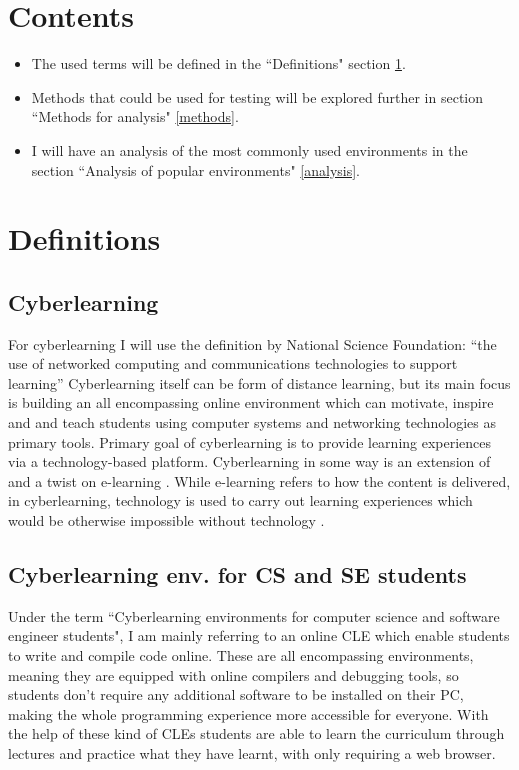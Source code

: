 \documentclass[10pt,english,a4paper]{article}
\begin{document}
\section*{Contents}

\begin{itemize}
     \item The used terms will be defined in the ``Definitions" section \ref{definitions}.
     \item Methods that could be used for testing will be explored further in section ``Methods for analysis" \ref{methods}.
     \item I will have an analysis of the most commonly used environments in the section ``Analysis of popular environments" \ref{analysis}.
\end{itemize}


\section{Definitions}\label{definitions}

\subsection{Cyberlearning}
For cyberlearning I will use the definition by National Science Foundation: 
``the use of networked computing and communications technologies to support learning” \cite{borgman_2017_fostering} 
Cyberlearning itself can be form of distance learning, but its main focus is building an all 
encompassing online environment which can motivate, inspire and and teach students using 
computer systems and networking technologies as primary tools\cite{ui/ux}.
Primary goal of cyberlearning is to provide learning experiences via a technology-based platform. 
Cyberlearning in some way is an extension of and a twist on e-learning \cite{lynch_2020_cyberlearning}.
While e-learning refers to how the content is delivered, in cyberlearning, technology
is used to carry out learning experiences which would be otherwise impossible without technology \cite{lynch_2020_cyberlearning}.

\subsection{Cyberlearning env. for CS and SE students}
Under the term ``Cyberlearning environments for computer science and software engineer students", I am mainly
referring to an online CLE which enable students to write and compile code online. These are all encompassing
environments, meaning they are equipped with 
online compilers and debugging tools, so students don't require any additional software to be installed on their PC, making
the whole programming experience more accessible for everyone.
With the help of these kind of CLEs students are able to learn the curriculum through lectures and practice
what they have learnt, with only requiring a web browser.
\end{document}
